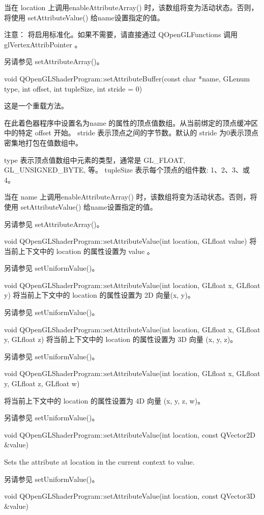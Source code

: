当在 location 上调用enableAttributeArray() 时，该数组将变为活动状态。否则，将使用 setAttributeValue() 给name设置指定的值。

注意： 将启用标准化。如果不需要，请直接通过 QOpenGLFunctions 调用glVertexAttribPointer 。

另请参见 setAttributeArray()。

void QOpenGLShaderProgram::setAttributeBuffer(const char *name, GLenum type, int offset, int tupleSize, int stride = 0)

这是一个重载方法。

在此着色器程序中设置名为name 的属性的顶点值数组。从当前绑定的顶点缓冲区中的特定 offset 开始。 stride 表示顶点之间的字节数。默认的 stride 为0表示顶点密集地打包在值数组中。

type 表示顶点值数组中元素的类型，通常是 GL\_FLOAT, GL\_UNSIGNED\_BYTE, 等。 tupleSize 表示每个顶点的组件数: 1、2、3、或 4。

当在 name 上调用enableAttributeArray() 时，该数组将变为活动状态。否则，将使用 setAttributeValue() 给name设置指定的值。

另请参见 setAttributeArray()。

void QOpenGLShaderProgram::setAttributeValue(int location, GLfloat value)
将当前上下文中的 location 的属性设置为 value 。

另请参见 setUniformValue()。

void QOpenGLShaderProgram::setAttributeValue(int location, GLfloat x, GLfloat y)
将当前上下文中的 location 的属性设置为 2D 向量(x, y)。

另请参见 setUniformValue()。

void QOpenGLShaderProgram::setAttributeValue(int location, GLfloat x, GLfloat y, GLfloat z)
将当前上下文中的 location 的属性设置为 3D 向量 (x, y, z)。

另请参见 setUniformValue()。

void QOpenGLShaderProgram::setAttributeValue(int location, GLfloat x, GLfloat y, GLfloat z, GLfloat w)

将当前上下文中的 location 的属性设置为 4D 向量 (x, y, z, w)。

另请参见 setUniformValue()。

void QOpenGLShaderProgram::setAttributeValue(int location, const QVector2D \&value)

Sets the attribute at location in the current context to value.

另请参见 setUniformValue()。

void QOpenGLShaderProgram::setAttributeValue(int location, const QVector3D \&value)


